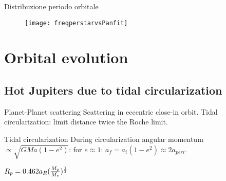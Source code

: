 \begin{frame}{Distribuzione periodo orbitale}
\begin{figure}[!ht]\texttt{[image: freqperstarvsPanfit]}\label{fig:freqperstarvsPanfit}\end{figure}

\end{frame}

\section{Orbital evolution}

\subsection{Hot Jupiters due to tidal circularization}

\begin{frame}{Planet-Planet scattering}
Scattering in eccentric close-in orbit. Tidal circularization: limit distance twice the Roche limit.
\end{frame}

\begin{wordonframe}{Tidal circularization}
During circularization angular momentum $\propto \sqrt{GMa(1-e^2)}$: for $e\approx1$: $a_f=a_i(1-e^2)\approx2a_{peri}$.

$R_p=0.462a_R(\frac{M_p}{M_*})^{\frac{1}{3}}$ 
\end{wordonframe}
